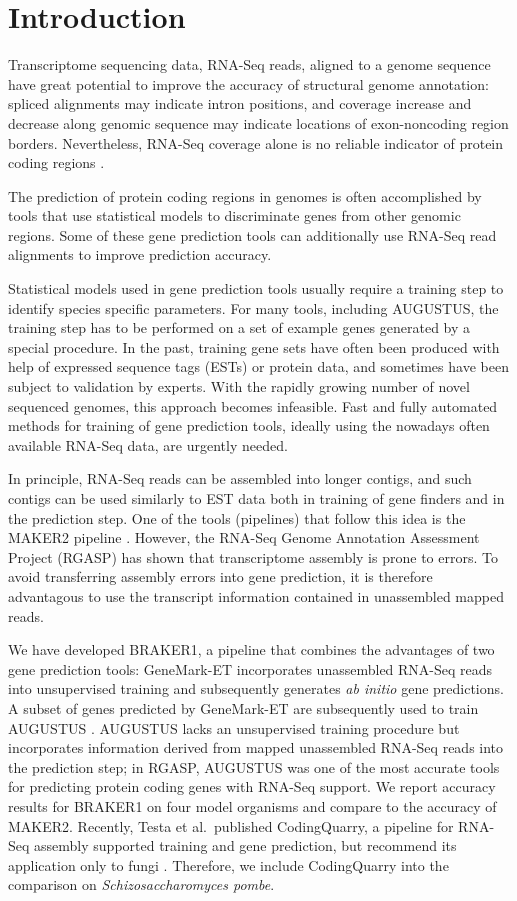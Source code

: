 \documentclass{bioinfo}
\begin{document}
\section{Introduction}

Transcriptome sequencing data, RNA-Seq reads, aligned to a genome sequence have great potential to improve the accuracy of structural genome annotation: spliced alignments may indicate intron positions, and coverage increase and decrease along genomic sequence may indicate locations of exon-noncoding region borders. Nevertheless, RNA-Seq coverage alone is no reliable indicator of protein coding regions \citep{InsectOpinion2015}. 

The prediction of protein coding regions in genomes is often accomplished by tools that use statistical models to discriminate genes from other genomic regions. Some of these gene prediction tools can additionally use RNA-Seq read alignments to improve prediction accuracy.

Statistical models used in gene prediction tools usually require a training  step to identify species specific parameters. For many tools, including AUGUSTUS, the training step has to be performed on a set of example genes generated by a special procedure. In the past, training gene sets have often been produced with help of expressed sequence tags (ESTs) or protein data, and sometimes have been subject to validation by experts. With the rapidly growing number of novel sequenced genomes, this approach becomes infeasible. Fast and fully automated methods for training of gene prediction tools, ideally using the nowadays often available RNA-Seq data, are urgently needed.

In principle, RNA-Seq reads can be assembled into longer contigs, and such contigs can be used similarly to EST data both in training of gene finders and in the prediction step. One of the tools (pipelines) that follow this idea is the MAKER2 pipeline \citep{MAKER2}. However, the RNA-Seq Genome Annotation Assessment Project (RGASP) \citep{RGASP} has shown that transcriptome assembly is prone to errors. To avoid transferring assembly errors into gene prediction, it is therefore advantagous to use the transcript information contained in unassembled mapped reads.

We have developed BRAKER1, a pipeline that combines the advantages of two gene prediction tools: GeneMark-ET \citep{GeneMark-ET} incorporates unassembled RNA-Seq reads into unsupervised training and subsequently generates \textit{ab initio} gene predictions. A subset of genes predicted by GeneMark-ET are subsequently used to train AUGUSTUS \citep{AUGUSTUS}. AUGUSTUS lacks an unsupervised training procedure but incorporates information derived from mapped unassembled RNA-Seq reads into the prediction step; in RGASP, AUGUSTUS was one of the most accurate tools for predicting protein coding genes with RNA-Seq support. We report accuracy results for BRAKER1 on four model organisms and compare to the accuracy of MAKER2. Recently, Testa et al.~published CodingQuarry, a pipeline for RNA-Seq assembly supported training and gene prediction, but recommend its application only to fungi \citep{CodingQuarry}. Therefore, we 
include CodingQuarry into the comparison on \textit{Schizosaccharomyces pombe}.
\end{document}
